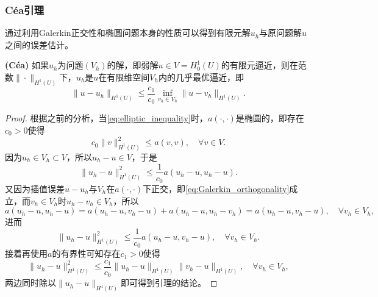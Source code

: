 \documentclass[a4paper,10pt]{ctexart}
\begin{document}
\subsubsection{Céa引理}
通过利用Galerkin正交性和椭圆问题本身的性质可以得到有限元解$ u_h $与原问题解$ u $之间的误差估计。
\begin{lemma}{\normalfont\bf{(Céa)}}\label{lemma:Cea}
    如果$ u_h $为问题$ (V_h) $的解，即弱解$ u\in V=H^1_0(U) $的有限元逼近，则在范数$ \| \cdot \|_{H^1(U)} $下，$ u_h $是$ u $在有限维空间$ V_h $内的几乎最优逼近，即
    \begin{equation}\label{eq:Cea}
        \| u-u_h \|_{H^1(U)} \leqslant \frac{c_1}{c_0}\inf_{v_h\in V_h}\| u-v_h \|_{H^1(U)}.
    \end{equation}
\end{lemma}
\begin{proof}
    根据之前的分析，当\eqref{eq:elliptic_inequality}时，$ a(\cdot,\cdot) $是椭圆的，即存在$ c_0>0 $使得
    \[
        c_0\| v \|_{H^1(U)}^2 \leqslant a(v,v),\quad \forall v\in V.
    \]
    因为$ u_h\in V_h\subset V $，所以$ u_h-u\in V $，于是
    \[
        \| u_h-u \|_{H^1(U)}^2 \leqslant \frac{1}{c_0}a(u_h-u,u_h-u).
    \]
    又因为插值误差$ u-u_h $与$ V_h $在$ a(\cdot,\cdot) $下正交，即\eqref{eq:Galerkin_orthogonality}成立，而$ v_h\in V_h $时$ u_h-v_h\in V_h $，所以
    \[
        a(u_h-u,u_h-u) = a(u_h-u,v_h-u) + a(u_h-u,u_h-v_h) = a(u_h-u,v_h-u),\quad \forall v_h\in V_h,
    \]
    进而
    \[
        \| u_h-u \|_{H^1(U)}^2 \leqslant \frac{1}{c_0}a(u_h-u,v_h-u),\quad \forall v_h\in V_h.
    \]
    接着再使用$ a $的有界性可知存在$ c_1>0 $使得
    \[
        \| u_h-u \|_{H^1(U)}^2 \leqslant \frac{c_1}{c_0}\| u_h-u \|_{H^1(U)}\| v_h-u \|_{H^1(U)},\quad \forall v_h\in V_h,
    \]
    两边同时除以$ \| u_h-u \|_{H^1(U)} $即可得到引理的结论。
\end{proof}
\end{document}
